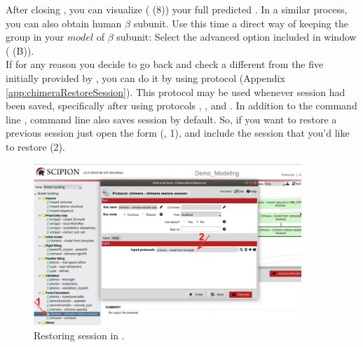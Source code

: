  After closing \chimera, you can visualize ( (8)) your full predicted . In a similar process, you can also obtain human  $\beta$ subunit. %
 Use this time a direct way of keeping the  group in your $model$ of  $\beta$ subunit: Select the advanced option  included in   window ( (B)).\\
  
If for any reason you decide to go back and check a different  from the five  initially provided by \modeller, you can do it by using  protocol (Appendix \ref{app:chimeraRestoreSession}). This protocol may be used whenever \chimera session had been saved, specifically after using protocols \chimera {}, \chimera {}, and \chimera {}. In addition to the \chimera command line , command line  also saves \chimera session by default. So, if you want to restore a previous session just open the form (, 1), and include the session that you'd like to restore (2).

 \begin{figure}[H]
  \centering 
  \captionsetup{width=.7\linewidth} 
  \includegraphics[width=0.90\textwidth]{Images/Fig17}
  \caption{Restoring session in \chimera.}
  \label{fig:restore_session_protocol}
  \end{figure}
